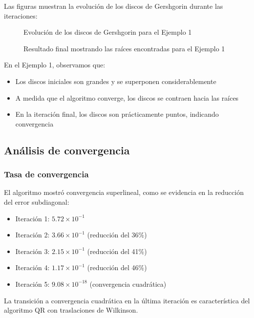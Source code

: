 \documentclass[12pt]{article}
\begin{document}
Las figuras muestran la evolución de los discos de Gershgorin durante las iteraciones:

\begin{figure}[h]
    \centering
    \caption{Evolución de los discos de Gershgorin para el Ejemplo 1}
    \label{fig:gershgorin1}
\end{figure}

\begin{figure}[h]
    \centering
    \caption{Resultado final mostrando las raíces encontradas para el Ejemplo 1}
    \label{fig:raices1}
\end{figure}

En el Ejemplo 1, observamos que:
\begin{itemize}
    \item Los discos iniciales son grandes y se superponen considerablemente
    \item A medida que el algoritmo converge, los discos se contraen hacia las raíces
    \item En la iteración final, los discos son prácticamente puntos, indicando convergencia
\end{itemize}

\subsection{Análisis de convergencia}

\subsubsection{Tasa de convergencia}

El algoritmo mostró convergencia superlineal, como se evidencia en la reducción del error subdiagonal:

\begin{itemize}
    \item Iteración 1: $5.72 \times 10^{-1}$
    \item Iteración 2: $3.66 \times 10^{-1}$ (reducción del 36\%)
    \item Iteración 3: $2.15 \times 10^{-1}$ (reducción del 41\%)
    \item Iteración 4: $1.17 \times 10^{-1}$ (reducción del 46\%)
    \item Iteración 5: $9.08 \times 10^{-18}$ (convergencia cuadrática)
\end{itemize}

La transición a convergencia cuadrática en la última iteración es característica del algoritmo QR con traslaciones de Wilkinson.
\end{document}
